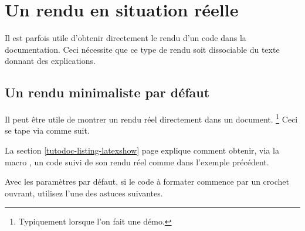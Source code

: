 \documentclass{tutodoc}
\begin{document}
\section{Un rendu en situation réelle}
\label{tutodoc-showcase}

Il est parfois utile d'obtenir directement le rendu d'un code dans la documentation. Ceci nécessite que ce type de rendu soit dissociable du texte donnant des explications.



\subsection{Un rendu minimaliste par défaut}

\begin{tdocexa}
    Il peut être utile de montrer un rendu réel directement dans un document.%
    \footnote{
        Typiquement lorsque l'on fait une démo.
    }
    Ceci se tape via  comme suit.

\end{tdocexa}


\begin{tdocrem}
    La section \ref{tutodoc-listing-latexshow} page \pageref{tutodoc-listing-latexshow} explique comment obtenir, via la macro , un code suivi de son rendu réel comme dans l'exemple précédent.
\end{tdocrem}


\begin{tdocwarn}
    Avec les paramètres par défaut, si le code à formater commence par un crochet ouvrant, utilisez l'une des astuces suivantes.

    \tdoclatexshow[explain = {Ceci produira ce qui suit.}]%
    		      {examples/showcase/hook.tex}
\end{tdocwarn}
\end{document}
